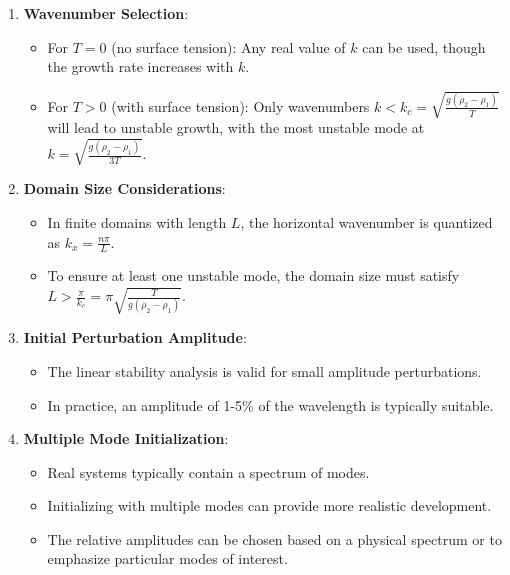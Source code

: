 \documentclass[12pt,a4paper]{article}
\begin{document}
\begin{enumerate}
    \item \textbf{Wavenumber Selection}:
    \begin{itemize}
        \item For $T = 0$ (no surface tension): Any real value of $k$ can be used, though the growth rate increases with $k$.
        \item For $T > 0$ (with surface tension): Only wavenumbers $k < k_c = \sqrt{\frac{g(\rho_2-\rho_1)}{T}}$ will lead to unstable growth, with the most unstable mode at $k = \sqrt{\frac{g(\rho_2-\rho_1)}{3T}}$.
    \end{itemize}
    
    \item \textbf{Domain Size Considerations}:
    \begin{itemize}
        \item In finite domains with length $L$, the horizontal wavenumber is quantized as $k_x = \frac{n\pi}{L}$.
        \item To ensure at least one unstable mode, the domain size must satisfy $L > \frac{\pi}{k_c} = \pi\sqrt{\frac{T}{g(\rho_2-\rho_1)}}$.
    \end{itemize}
    
    \item \textbf{Initial Perturbation Amplitude}:
    \begin{itemize}
        \item The linear stability analysis is valid for small amplitude perturbations.
        \item In practice, an amplitude of 1-5\% of the wavelength is typically suitable.
    \end{itemize}
    
    \item \textbf{Multiple Mode Initialization}:
    \begin{itemize}
        \item Real systems typically contain a spectrum of modes.
        \item Initializing with multiple modes can provide more realistic development.
        \item The relative amplitudes can be chosen based on a physical spectrum or to emphasize particular modes of interest.
    \end{itemize}
    

\end{enumerate}
\end{document}

